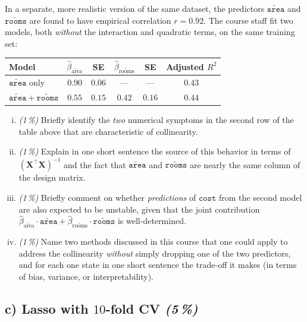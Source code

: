 \documentclass[11pt,a4paper]{article}
\newcommand{\subpoints}[1]{\textit{(#1\,\%)}}
\begin{document}
In a separate, more realistic version of the same dataset, the predictors $\widetilde{\texttt{area}}$ and $\widetilde{\texttt{rooms}}$ are found to have empirical correlation $r = 0.92$. The course staff fit two models, both \emph{without} the interaction and quadratic terms, on the same training set:
\begin{center}\small
\begin{tabular}{lccccc}
\toprule
\textbf{Model} & \textbf{$\hat\beta_{\widetilde{\text{area}}}$} & \textbf{SE} & \textbf{$\hat\beta_{\widetilde{\text{rooms}}}$} & \textbf{SE} & \textbf{Adjusted $R^2$} \\
\midrule
$\widetilde{\texttt{area}}$ only        & $0.90$ & $0.06$ & --- & --- & $0.43$ \\
$\widetilde{\texttt{area}} + \widetilde{\texttt{rooms}}$ & $0.55$ & $0.15$ & $0.42$ & $0.16$ & $0.44$ \\
\bottomrule
\end{tabular}
\end{center}

\begin{enumerate}[(i)]
  \item \subpoints{1} Briefly identify the \emph{two} numerical symptoms in the second row of the table above that are characteristic of collinearity.
  \item \subpoints{1} Explain in one short sentence the source of this behavior in terms of $(\mathbf X^\top \mathbf X)^{-1}$ and the fact that $\widetilde{\texttt{area}}$ and $\widetilde{\texttt{rooms}}$ are nearly the same column of the design matrix.
  \item \subpoints{1} Briefly comment on whether \emph{predictions} of $\texttt{cost}$ from the second model are also expected to be unstable, given that the joint contribution $\hat\beta_{\widetilde{\text{area}}} \cdot \widetilde{\texttt{area}} + \hat\beta_{\widetilde{\text{rooms}}} \cdot \widetilde{\texttt{rooms}}$ is well-determined.
  \item \subpoints{1} Name two methods discussed in this course that one could apply to address the collinearity \emph{without} simply dropping one of the two predictors, and for each one state in one short sentence the trade-off it makes (in terms of bias, variance, or interpretability).
\end{enumerate}

\subsection*{c) Lasso with $10$-fold CV \subpoints{5}}
\end{document}

